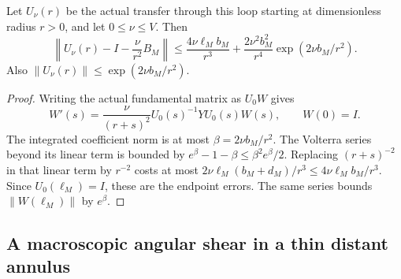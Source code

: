 \begin{lemma}
\label{cc:one-loop}
Let $U_\nu(r)$ be the actual transfer through this loop starting at
dimensionless radius $r>0$, and let $0\leq\nu\leq V$. Then
\begin{equation}\label{cc:one-loop-error}
 \left\|U_\nu(r)-I-\frac{\nu}{r^2}B_M\right\|
 \leq \frac{4\nu\ell_Mb_M}{r^3}
       +\frac{2\nu^2b_M^2}{r^4}\exp(2\nu b_M/r^2).
\end{equation}
Also $\|U_\nu(r)\|\leq\exp(2\nu b_M/r^2)$.
\end{lemma}
\begin{proof}
Writing the actual fundamental matrix as $U_0W$ gives
\[
 W'(s)=\frac{\nu}{(r+s)^2}U_0(s)^{-1}YU_0(s)W(s),
 \qquad W(0)=I.
\]
The integrated coefficient norm is at most $\beta=2\nu b_M/r^2$.
The Volterra series beyond its linear term is bounded by
$e^\beta-1-\beta\leq\beta^2e^\beta/2$.
Replacing $(r+s)^{-2}$ in that linear term by $r^{-2}$ costs
at most $2\nu\ell_M(b_M+d_M)/r^3\leq4\nu\ell_Mb_M/r^3$.
Since $U_0(\ell_M)=I$, these are the endpoint errors.
The same series bounds $\|W(\ell_M)\|$ by $e^\beta$.
\end{proof}

\subsection{A macroscopic angular shear in a thin distant annulus}

